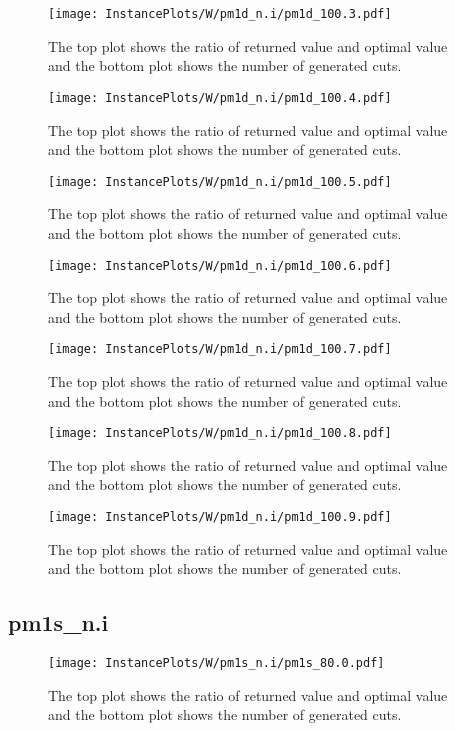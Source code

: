 \documentclass[10pt,a4paper]{article}
\begin{document}
\begin{figure}[H]
\texttt{[image: InstancePlots/W/pm1d\_n.i/pm1d\_100.3.pdf]}
\caption{The top plot shows the ratio of returned value and optimal value     and the bottom plot shows the number of generated cuts.}
\end{figure}

\begin{figure}[H]
\texttt{[image: InstancePlots/W/pm1d\_n.i/pm1d\_100.4.pdf]}
\caption{The top plot shows the ratio of returned value and optimal value     and the bottom plot shows the number of generated cuts.}
\end{figure}

\begin{figure}[H]
\texttt{[image: InstancePlots/W/pm1d\_n.i/pm1d\_100.5.pdf]}
\caption{The top plot shows the ratio of returned value and optimal value     and the bottom plot shows the number of generated cuts.}
\end{figure}

\begin{figure}[H]
\texttt{[image: InstancePlots/W/pm1d\_n.i/pm1d\_100.6.pdf]}
\caption{The top plot shows the ratio of returned value and optimal value     and the bottom plot shows the number of generated cuts.}
\end{figure}

\begin{figure}[H]
\texttt{[image: InstancePlots/W/pm1d\_n.i/pm1d\_100.7.pdf]}
\caption{The top plot shows the ratio of returned value and optimal value     and the bottom plot shows the number of generated cuts.}
\end{figure}

\begin{figure}[H]
\texttt{[image: InstancePlots/W/pm1d\_n.i/pm1d\_100.8.pdf]}
\caption{The top plot shows the ratio of returned value and optimal value     and the bottom plot shows the number of generated cuts.}
\end{figure}

\begin{figure}[H]
\texttt{[image: InstancePlots/W/pm1d\_n.i/pm1d\_100.9.pdf]}
\caption{The top plot shows the ratio of returned value and optimal value     and the bottom plot shows the number of generated cuts.}
\end{figure}

\subsection{pm1s\_n.i}
\begin{figure}[H]
\texttt{[image: InstancePlots/W/pm1s\_n.i/pm1s\_80.0.pdf]}
\caption{The top plot shows the ratio of returned value and optimal value     and the bottom plot shows the number of generated cuts.}
\end{figure}
\end{document}

